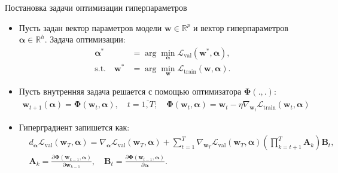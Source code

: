 \documentclass[aspectratio=169]{beamer}
\def\ltrn{\mathcal{L}_{\mathrm{train}}}
\def\lval{\mathcal{L}_{\mathrm{val}}}
\newcommand{\vect}[1]{\boldsymbol{\mathbf{#1}}}
\begin{document}
\begin{frame}{Постановка задачи оптимизации гиперпараметров}
\begin{itemize}
  \item Пусть задан вектор параметров модели $\mathbf{w} \in \mathbb{R}^p$ и вектор гиперпараметров
  $\boldsymbol{\alpha} \in \mathbb{R}^h$. Задача оптимизации:
  \begin{align*}
    \boldsymbol{\alpha}^* &= \arg\min_{\boldsymbol{\alpha}}\lval(\mathbf{w}^*, \boldsymbol{\alpha}), \\
    \mathrm{s.t.} \quad \mathbf{w}^* &= \arg\min_{\mathbf{w}}\ltrn(\mathbf{w}, \boldsymbol{\alpha}).
  \end{align*}
  \item Пусть внутренняя задача решается с помощью оптимизатора $\mathbf{\Phi}(., .)$:
  \begin{align*}
    \mathbf{w}_{t + 1}(\boldsymbol{\alpha}) = \mathbf{\Phi}(\mathbf{w}_t, \boldsymbol{\alpha}), \quad
    t = \overline{1, T}; \quad \vect{\Phi}(\vect{w}_{t}, \vect{\alpha}) = \vect{w}_t - \eta\nabla_{\vect{w}_t}\ltrn(\vect{w}_t, \vect{\alpha})
  \end{align*}
  \item Гиперградиент запишется как:
  \begin{align*}
    &d_{\vect{\alpha}}\mathcal{L}_\text{val}(\vect{w}_T, \vect{\alpha}) = \nabla_{\vect{\alpha}}\mathcal{L}_\text{val}(\vect{w}_T, \vect{\alpha}) + \sum_{t=1}^T \nabla_{\vect{w}_T}\mathcal{L}_\text{val}(\vect{w}_T, \vect{\alpha})\left(\prod_{k=t+1}^T\vect{A}_k\right)\vect{B}_t, \\
    &\vect{A}_k = \frac{\partial\vect{\Phi}(\vect{w}_{k-1}, \vect{\alpha})}{\partial\vect{w}_{k-1}}, \quad \vect{B}_t = \frac{\partial\vect{\Phi}(\vect{w}_{t-1}, \vect{\alpha})}{\partial\vect{\alpha}}.
\end{align*}
\end{itemize}
\end{frame}
\end{document}
